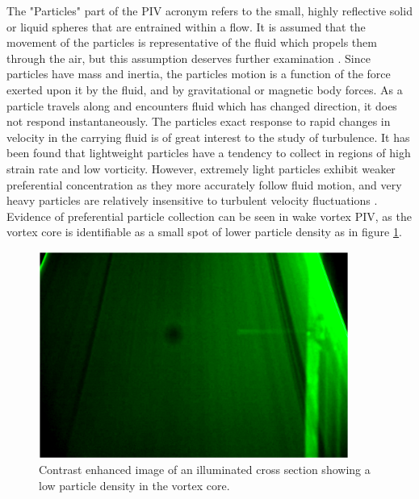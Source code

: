 The "Particles" part of the PIV acronym refers to the small, highly reflective 
solid or liquid spheres that are entrained within a flow. It is assumed that 
the movement of the particles is representative of the fluid which propels them 
through the air, but this assumption deserves further examination 
\cite{roscoe1952}. Since particles have mass and inertia, the particles motion 
is a function of the force exerted upon it by the fluid, and by gravitational 
or magnetic body forces. As a particle travels along and encounters fluid which 
has changed direction, it does not respond instantaneously. The particles exact 
response to rapid changes in velocity in the carrying fluid is of great 
interest to the study of turbulence. It has been found that lightweight 
particles have a tendency to collect in regions of high strain rate and low 
vorticity. However, extremely light particles exhibit weaker preferential 
concentration as they more accurately follow fluid motion, and very heavy 
particles are relatively insensitive to turbulent velocity fluctuations 
\cite{squires1990}. Evidence of preferential particle collection can be seen in 
wake vortex PIV, as the vortex core is identifiable as a small spot of lower 
particle density as in figure \ref{fig:vortex_core_particles}.
	
\begin{figure}
	\centering
	\includegraphics[width=4in]{figs/piv_method/vortex_core}
	\caption{Contrast enhanced image of an illuminated cross section showing a 
	low particle density in the vortex core.}
	\label{fig:vortex_core_particles}
\end{figure}

